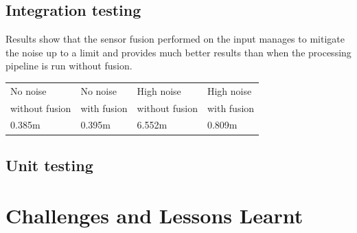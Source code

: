 \documentclass[prodmode,acmtosem]{acmsmall} %
\begin{document}
\subsection{Integration testing}
Results show that the sensor fusion performed on the input manages to mitigate the noise up to a limit and provides much better results than when the processing pipeline is run without fusion.

\begin{center}
\begin{tabularx}{\textwidth}{| X | X | X | X |} 
\hline
No noise & No noise  & High noise  & High noise  \\
without fusion & with fusion & without fusion & with fusion \\
\hline
0.385m & 0.395m & 6.552m & 0.809m \\
\hline
\end{tabularx}
\label{tab:performance}
\end{center}

\subsection{Unit testing}




\section{Challenges and Lessons Learnt}
\end{document}
